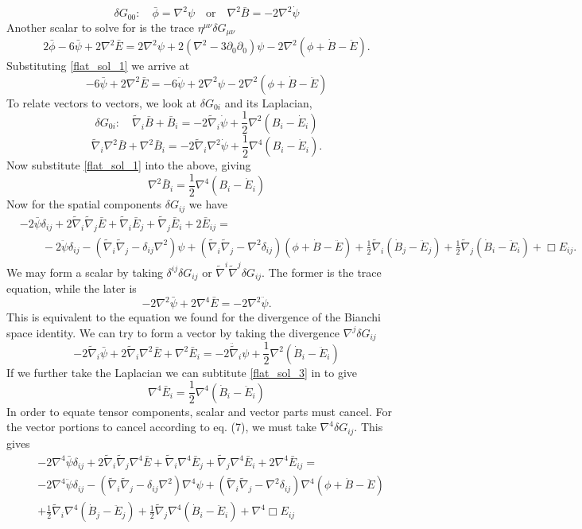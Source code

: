 \documentclass[10pt,letterpaper]{article}
\newcommand{\be}{\begin{equation}} %
\newcommand{\ee}{\end{equation}} %
\newcommand{\del}{\nabla} %
\newcommand{\pd}{\partial}
\numberwithin{equation}{section}
\begin{document}
\be
	\delta G_{00}:\quad \boxed{\bar \phi = \del^2 \psi} \quad\text{or}\quad \boxed{\del^2\bar B = -2\del^2 \dot\psi}\label{flat_sol_1}
\ee
Another scalar to solve for is the trace $\eta^{\mu\nu} \delta G_{\mu\nu}$
\be
	2\bar\phi - 6\bar \psi + 2\del^2 \bar E = 2\del^2 \psi +2(\del^2-3\pd_0\pd_0)\psi - 2\del^2 (\phi +\dot B - \ddot E) .
\ee
Substituting \ref{flat_sol_1} we arrive at
\be
	\boxed{-6\bar\psi + 2\del^2 \bar E = -6 \ddot \psi+2\del^2\psi - 2\del^2 (\phi +\dot B - \ddot E)}\label{flat_sol_2}
\ee
To relate vectors to vectors, we look at $\delta G_{0i}$ and its Laplacian,
\be
	\delta G_{0i}:\quad \tilde\del_i \bar B +\bar B_i = -2\tilde\del_i \dot \psi + \frac12 \del^2(B_i-\dot E_i)
\ee
\be
	\tilde\del_i \del^2 \bar B + \del^2 \bar B_i = -2 \tilde\del_i \del^2 \dot \psi + \frac12 \del^4 (B_i - \dot E_i).
\ee
Now substitute \ref{flat_sol_1}  into the above, giving
\be
	\boxed{\del^2 \bar B_i = \frac12 \del^4(B_i - \dot E_i)}
\ee
Now for the spatial components $\delta G_{ij}$ we have
\begin{align}
	& -2\bar \psi \delta_{ij} + 2 \tilde\del_i\tilde\del_j \bar E + \tilde\del_i \bar E_j +\tilde\del_j \bar E_i + 2\bar E_{ij} =\\
	&\qquad-2 \ddot \psi \delta_{ij} - (\tilde\del_i\tilde\del_j - \delta_{ij} \del^2)\psi + (\tilde\del_i\tilde\del_j - \del^2 \delta_{ij})(\phi+\dot B - \ddot E) + \frac12 \tilde\del_i (\dot B_j-\ddot E_j)+\frac12 \tilde\del_j (\dot B_i - \ddot E_i) + \Box E_{ij}. \nonumber
\end{align}
We may form a scalar by taking $\delta^{ij}\delta G_{ij}$ or $\tilde\del^i\tilde\del^j \delta G_{ij}$. The former is the trace equation, while the later is
\be
	\boxed{-2\del^2\bar \psi + 2\del^4 \bar E = -2 \del^2 \ddot \psi }.\label{flat_sol_3}
\ee
This is equivalent to the equation we found for the divergence of the Bianchi space identity. We can try to form a vector by taking the divergence $\del^j\delta G_{ij}$
\be
	-2\tilde\del_i \bar \psi + 2\tilde\del_i \del^2 \bar E + \del^2 \bar E_i = -2\ddot \tilde\del_i \psi+\frac12 \del^2(\dot B_i - \ddot E_i)
\ee
If we further take the Laplacian we can subtitute \ref{flat_sol_3} in to give
\be
	\boxed{\del^4 \bar E_i = \frac12 \del^4 (\dot B_i -\ddot E_i)}\label{flat_sol_4}
\ee
In order to equate tensor components, scalar and vector parts must cancel. For the vector portions to cancel according to eq. (7), we must take $\del^4 \delta G_{ij}$. This gives
\begin{align}
	& -2\del^4 \bar \psi \delta_{ij} + 2 \tilde\del_i\tilde\del_j \del^4\bar E + \tilde\del_i\del^4 \bar E_j +\tilde\del_j \del^4 \bar E_i + 2\del^4\bar E_{ij} =\\
	&-2\del^4 \ddot \psi \delta_{ij} - (\tilde\del_i\tilde\del_j - \delta_{ij} \del^2)\del^4\psi + (\tilde\del_i\tilde\del_j - \del^2 \delta_{ij})\del^4(\phi+\dot B - \ddot E) \nonumber\\
&+ \frac12 \tilde\del_i \del^4(\dot B_j-\ddot E_j)+\frac12 \tilde\del_j \del^4 (\dot B_i - \ddot E_i) + \del^4\Box E_{ij} \nonumber
\end{align}
\end{document}
